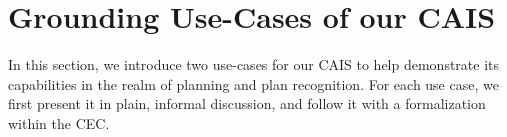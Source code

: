 \chapter{Grounding Use-Cases of our CAIS}\label{chap:use_cases}

In this section, we introduce two use-cases for our CAIS to help demonstrate
its capabilities in the realm of planning and plan recognition. For each
use case, we first present it in plain, informal discussion, and follow it
with a formalization within the CEC.




